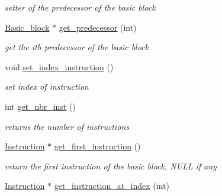\begin{DoxyCompactItemize}
\begin{DoxyCompactList}\small\item\em setter of the predecessor of the basic block \item\end{DoxyCompactList}\item 
\hypertarget{classBasic__block_a5381da0d3cfdae07df433ffac3e8ebae}{
\hyperlink{classBasic__block}{Basic\_\-block} $\ast$ \hyperlink{classBasic__block_a5381da0d3cfdae07df433ffac3e8ebae}{get\_\-predecessor} (int)}
\label{classBasic__block_a5381da0d3cfdae07df433ffac3e8ebae}

\begin{DoxyCompactList}\small\item\em get the ith predecessor of the basic block \item\end{DoxyCompactList}\item 
\hypertarget{classBasic__block_a16cd91bdc0ec93b661bf2e434a93a6de}{
void \hyperlink{classBasic__block_a16cd91bdc0ec93b661bf2e434a93a6de}{set\_\-index\_\-instruction} ()}
\label{classBasic__block_a16cd91bdc0ec93b661bf2e434a93a6de}

\begin{DoxyCompactList}\small\item\em set index of instruction \item\end{DoxyCompactList}\item 
\hypertarget{classBasic__block_a2290db897165e8069c1c8495627d0a54}{
int \hyperlink{classBasic__block_a2290db897165e8069c1c8495627d0a54}{get\_\-nbr\_\-inst} ()}
\label{classBasic__block_a2290db897165e8069c1c8495627d0a54}

\begin{DoxyCompactList}\small\item\em returns the number of instructions \item\end{DoxyCompactList}\item 
\hypertarget{classBasic__block_ae6bb481bd9c6352a9f3d7bc5bb2680ac}{
\hyperlink{classInstruction}{Instruction} $\ast$ \hyperlink{classBasic__block_ae6bb481bd9c6352a9f3d7bc5bb2680ac}{get\_\-first\_\-instruction} ()}
\label{classBasic__block_ae6bb481bd9c6352a9f3d7bc5bb2680ac}

\begin{DoxyCompactList}\small\item\em return the first instruction of the basic block, NULL if any \item\end{DoxyCompactList}\item 
\hypertarget{classBasic__block_a84aa42e38e2494c2f8ab0a159dba3ca8}{
\hyperlink{classInstruction}{Instruction} $\ast$ \hyperlink{classBasic__block_a84aa42e38e2494c2f8ab0a159dba3ca8}{get\_\-instruction\_\-at\_\-index} (int)}
\label{classBasic__block_a84aa42e38e2494c2f8ab0a159dba3ca8}


\end{DoxyCompactItemize}
